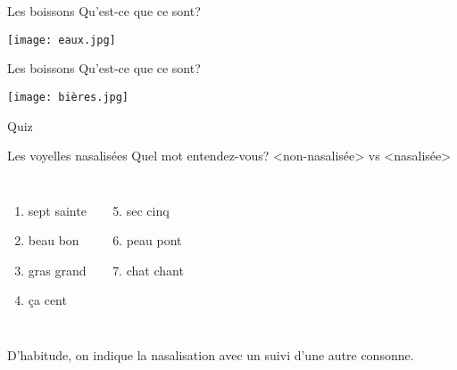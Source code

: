 \documentclass{beamer}
\begin{document}
  \begin{frame}{Les boissons}
    Qu'est-ce que ce sont? \underline{}
    \begin{center}
      \texttt{[image: eaux.jpg]}
    \end{center}
  \end{frame}

  \begin{frame}{Les boissons}
    Qu'est-ce que ce sont? \underline{}
    \begin{center}
      \texttt{[image: bières.jpg]}
    \end{center}
  \end{frame}

  \begin{frame}{}
    \begin{center}
      \Large Quiz
    \end{center}
  \end{frame}

  \begin{frame}{Les voyelles nasalisées}
    Quel mot entendez-vous? <non-nasalisée> vs <nasalisée>
    \begin{columns}[t]
        \begin{enumerate}
          \item sept sainte
          \item beau bon
          \item gras grand
          \item ça cent
        \end{enumerate}
        \begin{enumerate}
          \setcounter{enumi}{4}
          \item sec cinq
          \item peau pont
          \item chat chant
        \end{enumerate}
    \end{columns}
    \vspace{0.5cm}
    D'habitude, on indique la nasalisation avec un  suivi d'une autre consonne. \\
  \end{frame}
\end{document}
